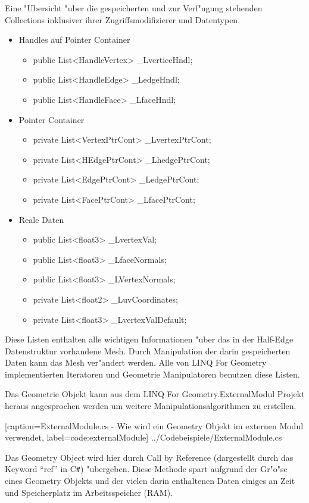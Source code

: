 \documentclass[pagesize, paper=a4, fontsize=12pt,titlepage=true, headings=small, headnosepline, abstractoff, liststotoc, nochapterprefix, plainheadsepline]{scrreprt}
\newcommand{\CS}{C\texttt{\#}}
\newcommand{\LFG}{LINQ For Geometry}
\newcommand{\LFGS}{LINQ For Geometry }
\newcommand{\HES}{Half-Edge Datenstruktur }
\begin{document}
Eine "Ubersicht "uber die gespeicherten und zur Verf"ugung stehenden Collections inklusiver ihrer Zugriffsmodifizierer und Datentypen.
\begin{itemize}
\item Handles auf Pointer Container
	\begin{itemize}
    \item public List<HandleVertex> \_LverticeHndl;
    \item public List<HandleEdge> \_LedgeHndl;
	\item public List<HandleFace> \_LfaceHndl;
	\end{itemize}
\item Pointer Container
	\begin{itemize}
	\item private List<VertexPtrCont> \_LvertexPtrCont;
	\item private List<HEdgePtrCont> \_LhedgePtrCont;
	\item private List<EdgePtrCont> \_LedgePtrCont;
	\item private List<FacePtrCont> \_LfacePtrCont;
	\end{itemize}
\item Reale Daten
	\begin{itemize}
	\item public List<float3> \_LvertexVal;
	\item public List<float3> \_LfaceNormals;
	\item public List<float3> \_LVertexNormals;
	\item private List<float2> \_LuvCoordinates;
	\item private List<float3> \_LvertexValDefault;
	\end{itemize}
\end{itemize}
Diese Listen enthalten alle wichtigen Informationen "uber das in der \HES vorhandene Mesh. Durch Manipulation der darin gespeicherten Daten kann das Mesh ver"andert werden. Alle von \LFGS implementierten Iteratoren und Geometrie Manipulatoren benutzen diese Listen.

Das Geometrie Objekt kann aus dem \LFG.ExternalModul Projekt heraus angesprochen werden um weitere Manipulationsalgorithmen zu erstellen.
\newline


			[caption={ExternalModule.cs - Wie wird ein Geometry Objekt im externen Modul verwendet}, label=code:externalModule]
			{../Codebeispiele/ExternalModule.cs}

Das Geometry Object wird hier durch Call by Reference (dargestellt durch das Keyword "`ref"' in \CS) "ubergeben. Diese Methode spart aufgrund der Gr"o"se eines Geometry Objekts und der vielen darin enthaltenen Daten einiges an Zeit und Speicherplatz im Arbeitsspeicher (RAM).
\end{document}
